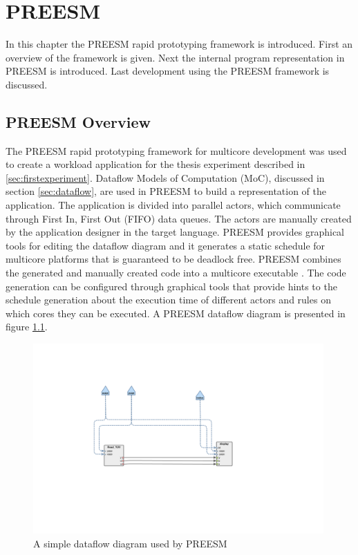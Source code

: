 \chapter{PREESM}
\label{chapter:preesm}
In this chapter the PREESM rapid prototyping framework is introduced. First an
overview of the framework is given. Next the internal program representation in
PREESM is introduced. Last development using the PREESM framework is discussed.

\section{PREESM Overview}
\label{sec:preesmover}
The PREESM rapid prototyping framework for multicore development was used to
create a workload application for the thesis experiment described in
\ref{sec:firstexperiment}. Dataflow Models of Computation (MoC), discussed in
section \ref{sec:dataflow}, are used in PREESM to build a representation of the
application. The application is divided into parallel actors, which communicate
through First In, First Out (FIFO) data queues. The actors are manually created
by the application designer in the target language. PREESM provides graphical
tools for editing the dataflow diagram and it generates a static schedule for
multicore platforms that is guaranteed to be deadlock free. PREESM combines the
generated and manually created code into a multicore executable
\cite{pelcat2014preesm}. The code generation can be configured through graphical
tools that provide hints to the schedule generation about the execution time of
different actors and rules on which cores they can be executed. A PREESM
dataflow diagram is presented in figure \ref{preesm_example}.

\begin{figure}[h!] \label{preesm_example} \begin{center}
    \includegraphics[width=0.99\textwidth]{images/example_preesm_diagram.png}
    \caption{A simple dataflow diagram used by PREESM} \end{center}
\end{figure}


